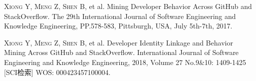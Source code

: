 
\begin{publications}{99}
    \item\textsc{Xiong Y, Meng Z, Shen B}, et al. {Mining Developer Behavior Across GitHub and StackOverflow}. The 29th International Journal of Software Engineering and Knowledge Engineering, PP.578-583, Pittsburgh, USA, July 5th-7th, 2017.
    \item\textsc{Xiong Y, Meng Z, Shen B}, et al. {Developer Identity Linkage and Behavior Mining Across GitHub and StackOverflow}. International Journal of Software Engineering and Knowledge Engineering, 2018, Volume 27 No.9\&10: 1409-1425 [SCI检索] WOS: 000423457100004.
\end{publications}
